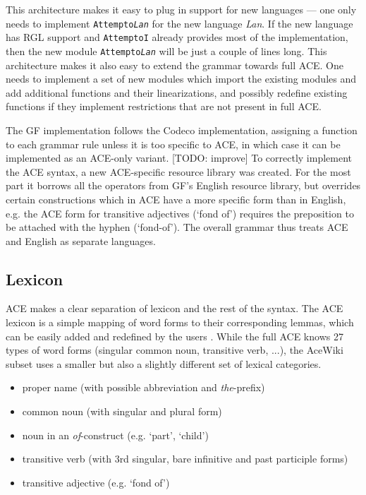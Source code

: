 \documentclass[a4paper]{article}
\begin{document}
This architecture makes it easy to plug in support for new languages ---
one only needs to implement \texttt{Attempto\textit{Lan}} for the new language
\textit{Lan}. If the new language has RGL support and \texttt{AttemptoI}
already provides most of the implementation, then
the new module \texttt{Attempto\textit{Lan}} will be just a couple of lines
long.
This architecture makes it also easy to extend the grammar towards full ACE.
One needs to implement a set of new modules which import the existing modules
and add additional functions and their linearizations, and possibly
redefine existing functions if they implement restrictions that are not
present in full ACE.

The GF implementation follows the Codeco implementation, assigning a function
to each grammar rule unless it is too specific to ACE, in which case it
can be implemented as an ACE-only variant. [TODO: improve]
To correctly implement the ACE syntax, a new ACE-specific resource library
was created. For the most part it borrows all the operators from GF's English
resource library, but overrides certain constructions which in ACE have a
more specific form than in English, e.g. the ACE form for transitive
adjectives (`fond of') requires the preposition to be attached with
the hyphen (`fond-of'). The overall grammar thus treats ACE and English as
separate languages.

\subsection{Lexicon}

ACE makes a clear separation of lexicon and the rest of the syntax. The ACE
lexicon is a simple mapping of word forms to their corresponding lemmas, which
can be easily added and redefined by the users
\cite{ACE_6.6_Lexicon_Specification}. While the full ACE knows 27 types of
word forms (singular common noun, transitive verb, ...), the AceWiki subset
uses a smaller but also a slightly different set of lexical categories.

\begin{itemize}
\item proper name (with possible abbreviation and \emph{the}-prefix)
\item common noun (with singular and plural form)
\item noun in an \emph{of}-construct (e.g. `part', `child')
\item transitive verb (with 3rd singular, bare infinitive and past participle
forms)
\item transitive adjective (e.g. `fond of')
\end{itemize}
\end{document}
